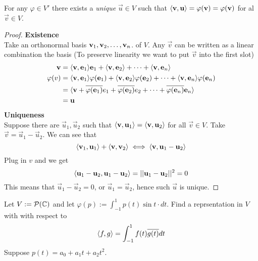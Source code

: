 \begin{theorem}
    For any $\varphi \in V'$ there exists a \textit{unique} $\vec u \in V$ such that $\langle \mathbf v, \mathbf u \rangle = \varphi (\mathbf v) = \varphi(\mathbf v)$ for al $\vec v \in V$.
\end{theorem}
\newpage
\begin{proof} \textbf{Existence} \\
    Take an orthonormal basis ${\mathbf v}_1,{\mathbf v}_2, \ldots, {\mathbf v}_{n}$. of $V$. Any $\vec v$ can be written as a linear combination the basis (To preserve linearity we want to put $\vec v$ into the first slot)
    \begin{align*} \mathbf v &= \langle \mathbf v , \mathbf e_1 \mathbf {\rangle} \mathbf e_1 + \langle \mathbf v, \mathbf e_2 \rangle + \cdots + \langle \mathbf v, \mathbf e_n \rangle \\
    \varphi(v) &= \langle \mathbf v , \mathbf e_1 \mathbf {\rangle} \varphi(\mathbf e_1) + \langle \mathbf v, \mathbf e_2 \rangle \varphi(\mathbf e_2)+ \cdots + \langle \mathbf v, \mathbf e_n \rangle \varphi(\mathbf e_n) \\
    &= \langle \mathbf v + \overline{\varphi(\mathbf e_1)}e_1 + \overline{\varphi(\mathbf e_2)}e_2 + \cdots + \overline{\varphi(\mathbf e_n)}\mathbf e_n \rangle \\ 
    &= \mathbf u 
    \end{align*}
    \textbf{Uniqueness} \\
    Suppose there are $\vec u_1, \vec u_2$ such that $\langle \mathbf v, \mathbf u_1 \rangle = \langle \mathbf v, \mathbf u_2 \rangle$ for all $\vec v \in V$. Take $\vec v = \vec u_1 - \vec u_2$. We can see that 
    \[ \langle \mathbf v_1, \mathbf u_1 \rangle + \langle \mathbf v, \mathbf v_2 \rangle \iff \langle \mathbf v, \mathbf u_1 - \mathbf u_2 \rangle\]
    Plug in $v$ and we get 
    \[ \langle \mathbf u_1 - \mathbf u_2, \mathbf u_1 - \mathbf u_2 \rangle = ||\mathbf u_1 - \mathbf u_2||^2 = 0\]
    This means that $\vec u_1 - \vec u_2 = 0$, or $\vec u_1 = \vec u_2$, hence such $\vec u$ is unique.
\end{proof}
\begin{example}
    Let $V := \mathcal P(\mathbb C)$ and let $\displaystyle \varphi(p) := \int_{-1}^1 p(t) \sin t \cdot dt$. Find a reprsentation in $V$ with with respect to
    \[ \langle f,g \rangle = \int_{-1}^1 f(t) \overline{g(t)} dt\] 
    Suppose $p(t) = a_0 + a_1t + a_2t^2$.
\end{example}

